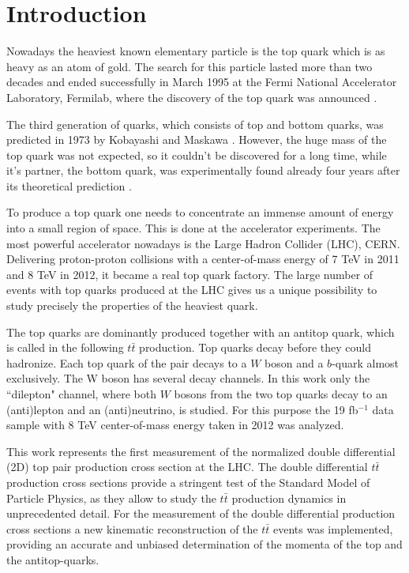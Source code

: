 \chapter{Introduction}

Nowadays the heaviest known elementary particle is the top quark which is as heavy as an atom of gold. 
The search for this particle lasted more than two decades and ended successfully 
in March 1995 at the Fermi National Accelerator Laboratory, Fermilab, where 
the discovery of the top quark was announced \cite{PhysRevLett.74.2626}. 

The third generation of quarks, which consists of top and bottom quarks, 
was predicted in 1973 by Kobayashi and Maskawa \cite{Kobayashi:1973fv}. However, the huge mass of the 
top quark was not expected, so it couldn't be discovered for a long time, while it's partner, 
the bottom quark, was experimentally found already four years after its theoretical prediction \cite{PhysRevLett.39.252}. 

To produce a top quark one needs to concentrate an immense amount of energy 
into a small region of space. This is done at the accelerator experiments. 
The most powerful accelerator nowadays is the Large Hadron Collider (LHC), CERN. 
Delivering proton-proton collisions with a center-of-mass energy of 7 TeV in 2011 and 8 TeV in 2012, 
it became a real top quark factory. The large number of events with top quarks
produced at the LHC gives us a unique possibility to study precisely the properties of the heaviest quark. 

The top quarks are dominantly produced together with an antitop quark, which is called in the 
following $t\bar{t}$ production. Top quarks decay before they could hadronize. 
Each top quark of the pair decays to a $W$ boson and a $b$-quark almost exclusively. 
The W boson has several decay channels. In this work only the ``dilepton" channel, 
where both $W$ bosons from the two top quarks decay to an (anti)lepton and an (anti)neutrino, is studied. 
For this purpose the 19 fb$^{-1}$ data sample with 8 TeV center-of-mass energy taken in 2012 was analyzed.

This work represents the first measurement of the normalized double differential (2D) top pair production
cross section at the LHC. The double differential $t\bar{t}$ production cross sections provide a stringent test of the 
Standard Model of Particle Physics, as they allow to study the $t\bar{t}$ production dynamics in unprecedented
detail. For the measurement of the double differential production cross sections a new kinematic reconstruction
of the $t\bar{t}$ events was implemented, providing an accurate and unbiased determination of the momenta of the
top and the antitop-quarks.

